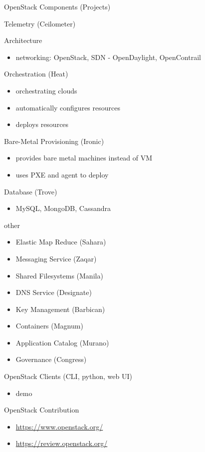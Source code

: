 \documentclass[presentation]{beamer}
\begin{document}
\begin{frame}[fragile,label={sec:orgdf62090}]{OpenStack Components (Projects)}
\begin{block}{Telemetry (Ceilometer)}
\begin{block}{Architecture}
\begin{itemize}
\item networking: OpenStack, SDN - OpenDaylight, OpenContrail
\end{itemize}
\end{block}
\end{block}
\begin{block}{Orchestration (Heat)}
\begin{itemize}
\item orchestrating clouds
\item automatically configures resources
\item deploys resources
\end{itemize}
\end{block}
\begin{block}{Bare-Metal Provisioning (Ironic)}
\begin{itemize}
\item provides bare metal machines instead of VM
\item uses PXE and agent to deploy
\end{itemize}
\end{block}
\begin{block}{Database (Trove)}
\begin{itemize}
\item MySQL, MongoDB, Cassandra
\end{itemize}
\end{block}
\begin{block}{other}
\begin{itemize}
\item Elastic Map Reduce (Sahara)
\item Messaging Service (Zaqar)
\item Shared Filesystems (Manila)
\item DNS Service (Designate)
\item Key Management (Barbican)
\item Containers (Magnum)
\item Application Catalog (Murano)
\item Governance (Congress)
\end{itemize}
\end{block}
\end{frame}
\begin{frame}[label={sec:org0e76afc}]{OpenStack Clients (CLI, python, web UI)}
\begin{itemize}
\item demo
\end{itemize}
\end{frame}
\begin{frame}[label={sec:orgaf38fdf}]{OpenStack Contribution}
\begin{itemize}
\item \url{https://www.openstack.org/}
\item \url{https://review.openstack.org/}
\end{itemize}
\end{frame}
\end{document}
